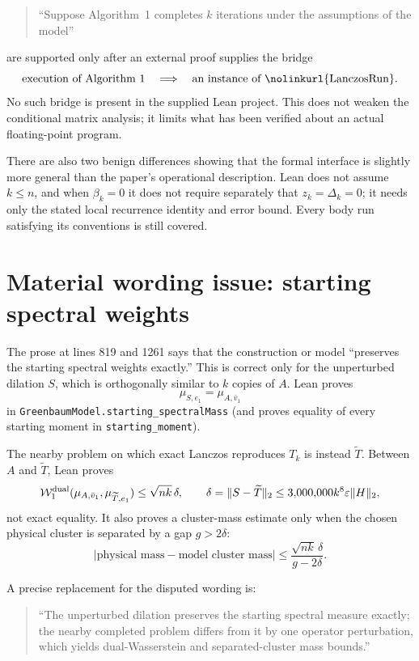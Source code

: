 \documentclass[11pt]{article}
\newcommand{\norm}[1]{\lVert #1\rVert_2}
\newcommand{\abs}[1]{\lvert #1\rvert}
\newcommand{\eps}{\varepsilon}
\newcommand{\lean}[1]{\nolinkurl{#1}}
\begin{document}
\begin{quote}
``Suppose Algorithm~1 completes $k$ iterations under the assumptions of the
model''
\end{quote}

are supported only after an external proof supplies the bridge
\[
 \text{execution of Algorithm 1}
 \quad\Longrightarrow\quad
 \text{an instance of \lean{LanczosRun}}.
\]
No such bridge is present in the supplied Lean project.  This does not weaken
the conditional matrix analysis; it limits what has been verified about an
actual floating-point program.

There are also two benign differences showing that the formal interface is
slightly more general than the paper's operational description.  Lean does
not assume $k\le n$, and when $\beta_k=0$ it does not require separately that
$z_k=\Delta_k=0$; it needs only the stated local recurrence identity and
error bound.  Every body run satisfying its conventions is still covered.

\section*{Material wording issue: starting spectral weights}

The prose at lines 819 and 1261 says that the construction or model
``preserves the starting spectral weights exactly.''  This is correct only
for the unperturbed dilation $S$, which is orthogonally similar to $k$ copies
of $A$.  Lean proves
\[
  \mu_{S,e_1}=\mu_{A,\bar v_1}
\]
in \lean{GreenbaumModel.starting\_spectralMass} (and proves equality of every
starting moment in \lean{starting\_moment}).

The nearby problem on which exact Lanczos reproduces $T_k$ is instead
$\widetilde T$.  Between $A$ and $\widetilde T$, Lean proves
\[
 \mathcal W^{\rm dual}_1
   (\mu_{A,\bar v_1},\mu_{\widetilde T,e_1})
 \le \sqrt{nk}\,\delta,
 \qquad
 \delta=\norm{S-\widetilde T}
 \le 3{,}000{,}000k^8\eps\norm H,
\]
not exact equality.  It also proves a cluster-mass estimate only when the
chosen physical cluster is separated by a gap $g>2\delta$:
\[
 \abs{\text{physical mass}-\text{model cluster mass}}
 \le \frac{\sqrt{nk}\,\delta}{g-2\delta}.
\]

A precise replacement for the disputed wording is:

\begin{quote}
``The unperturbed dilation preserves the starting spectral measure exactly;
the nearby completed problem differs from it by one operator perturbation,
which yields dual-Wasserstein and separated-cluster mass bounds.''
\end{quote}
\end{document}
